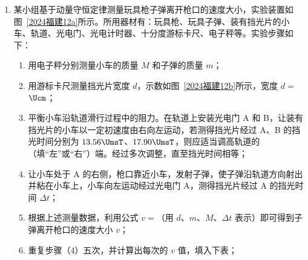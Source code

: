 \documentclass[\gkver]{gaokaozhenti}
\begin{document}
\begin{enumerate}
{$E_{O}=\frac{kQ}{R^{2}}+\frac{kQ}{R^{2}}=\frac{2kQ}{R^{2}}$

（2）电势是标量，取无穷远处为 0 电势，则 M 点、N 点的电势分别为

$\varphi_{M}=\varphi_{AM}+\varphi_{BM}+\varphi_{CM}+\varphi_{DM}+\varphi_{EM}+\varphi_{FM}+\varphi_{GM}+\varphi_{HM}$

$\varphi_{N}=\varphi_{AN}+\varphi_{BN}+\varphi_{CN}+\varphi_{DN}+\varphi_{EN}+\varphi_{FN}+\varphi_{GN}+\varphi_{HN}$

根据点电荷的电势 $\varphi=\frac{kQ}{r}$ 和对称性可知

$\varphi_{AM}=\varphi_{AN}=\varphi_{EM}=\varphi_{EN}$，$\varphi_{BM}=\varphi_{FN}=\varphi_{DM}=\varphi_{HN}$，$\varphi_{FM}=\varphi_{BN}=\varphi_{HM}=\varphi_{DN}$

$\varphi_{CM}>\varphi_{CN}>0$，$0>\varphi_{GM}>\varphi_{GN}$

可得 $\varphi_{M}-\varphi_{N}=\varphi_{CM}+\varphi_{GM}-(\varphi_{CN}+\varphi_{GN})>0$

则 $\varphi_{M} > \varphi_{N}$

（3）将 $+q$ 点电荷从 M 沿 MN 移动到 N 点，电势能减小，故电场力对该点电荷所做的总功大于零。
}

\item
某小组基于动量守恒定律测量玩具枪子弹离开枪口的速度大小，实验装置如图~\ref{2024福建12a}所示。所用器材有：玩具枪、玩具子弹、装有挡光片的小车、轨道、光电门、光电计时器、十分度游标卡尺、电子秤等。实验步骤如下：
\begin{enumerate}
	\item
	用电子秤分别测量小车的质量 $M$ 和子弹的质量 $m$；
	\item
	用游标卡尺测量挡光片宽度 $d$，示数如图~\ref{2024福建12b}所示，宽度 $d = $$\Ucm$；
	\item
	平衡小车沿轨道滑行过程中的阻力。在轨道上安装光电门 A 和 B，让装有挡光片的小车以一定初速度由右向左运动，若测得挡光片经过 A、B 的挡光时间分别为 $13.56 \UmsT$、$17.90 \UmsT$，则应适当调高轨道的（填“左”或“右”）端。经过多次调整，直至挡光时间相等；
	\item
	让小车处于 A 的右侧，枪口靠近小车，发射子弹，使子弹沿轨道方向射出并粘在小车上，小车向左运动经过光电门 A，测得挡光片经过 A 的挡光时间 $\Delta t$；
	\item
	根据上述测量数据，利用公式 $v = $（用 $d$、$m$、$M$、$\Delta t$ 表示）即可得到子弹离开枪口的速度大小 $v$；
	\item
	重复步骤（4）五次，并计算出每次的 $v$ 值，填入下表；


\end{enumerate}
\end{enumerate}
\end{document}
